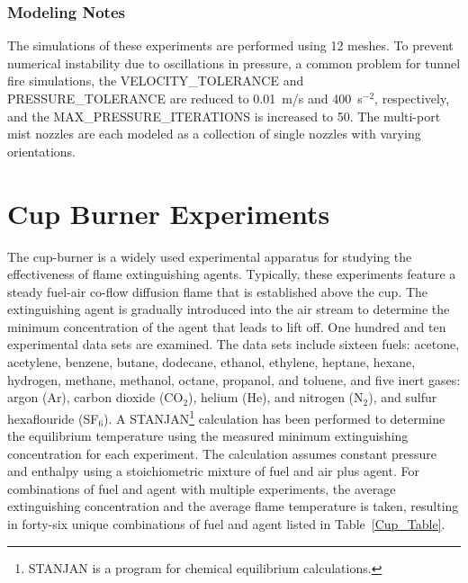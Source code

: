 \subsubsection{Modeling Notes}

The simulations of these experiments are performed using 12 meshes. To prevent numerical instability due to oscillations in pressure, a common problem for tunnel fire simulations, the {\ct VELOCITY\_TOLERANCE} and {\ct PRESSURE\_TOLERANCE} are reduced to 0.01~m/s and 400~s$^{-2}$, respectively, and the {\ct MAX\_PRESSURE\_ITERATIONS} is increased to 50. The multi-port mist nozzles are each modeled as a collection of single nozzles with varying orientations.



\section{Cup Burner Experiments}
\label{Cup_Burner_Description}

The cup-burner is a widely used experimental apparatus for studying the effectiveness of flame extinguishing agents. Typically, these experiments feature a steady fuel-air co-flow diffusion flame that is established above the cup. The extinguishing agent is gradually introduced into the air stream to determine the minimum concentration of the agent that leads to lift off. One hundred and ten experimental data sets are examined. The data sets include sixteen fuels: acetone, acetylene, benzene, butane, dodecane, ethanol, ethylene, heptane, hexane, hydrogen, methane, methanol, octane, propanol, and toluene, and five inert gases: argon (Ar), carbon dioxide (CO$_2$), helium (He), and nitrogen (N$_2$), and sulfur hexaflouride (SF$_6$). A STANJAN\footnote{STANJAN is a program for chemical equilibrium calculations.} calculation has been performed to determine the equilibrium temperature using the measured minimum extinguishing concentration for each experiment. The calculation assumes constant pressure and enthalpy using a stoichiometric mixture of fuel and air plus agent. For combinations of fuel and agent with multiple experiments, the average extinguishing concentration and the average flame temperature is taken, resulting in forty-six unique combinations of fuel and agent listed in Table~\ref{Cup_Table}.

